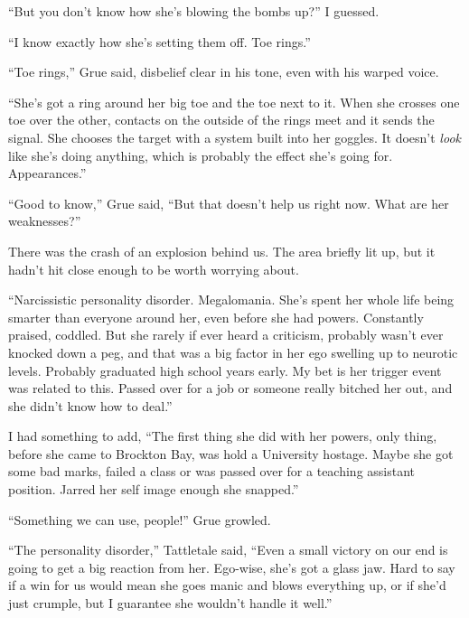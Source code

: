 ``But you don't know how she's blowing the bombs up?'' I guessed.



``I know exactly how she's setting them off.  Toe rings.''



``Toe rings,'' Grue said, disbelief clear in his tone, even with his warped voice.



``She's got a ring around her big toe and the toe next to it.  When she crosses one toe over the other, contacts on the outside of the rings meet and it sends the signal.  She chooses the target with a system built into her goggles.  It doesn't \emph{look} like she's doing anything, which is probably the effect she's going for.  Appearances.''



``Good to know,'' Grue said, ``But that doesn't help us right now.  What are her weaknesses?''



There was the crash of an explosion behind us.  The area briefly lit up, but it hadn't hit close enough to be worth worrying about.



``Narcissistic personality disorder.  Megalomania.  She's spent her whole life being smarter than everyone around her, even before she had powers.  Constantly praised, coddled.  But she rarely if ever heard a criticism, probably wasn't ever knocked down a peg, and that was a big factor in her ego swelling up to neurotic levels.  Probably graduated high school years early.  My bet is her trigger event was related to this.  Passed over for a job or someone really bitched her out, and she didn't know how to deal.''



I had something to add, ``The first thing she did with her powers, only thing, before she came to Brockton Bay, was hold a University hostage.  Maybe she got some bad marks, failed a class or was passed over for a teaching assistant position.  Jarred her self image enough she snapped.''



``Something we can use, people!'' Grue growled.



``The personality disorder,'' Tattletale said, ``Even a small victory on our end is going to get a big reaction from her.  Ego-wise, she's got a glass jaw.  Hard to say if a win for us would mean she goes manic and blows everything up, or if she'd just crumple, but I guarantee she wouldn't handle it well.''



